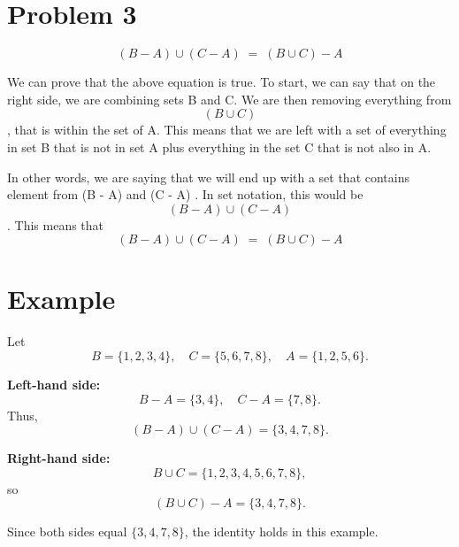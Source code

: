 \documentclass{article}
\begin{document}
\section*{Problem 3}

\[
    (B - A) \cup (C - A) \;=\; (B \cup C) - A
\]

We can prove that the above equation is true. To start, we can say that on the right side, we are combining sets B and C. We are then removing everything from \[(B \cup C)\], that is within the set of A. This means that we are left with a set of everything in set B that is not in set A plus everything in the set C that is not also in A.

In other words, we are saying that we will end up with a set that contains element from
(B - A) and (C - A)
. In set notation, this would be \[
    (B - A) \cup (C - A)
\]. This means that \[
    (B - A) \cup (C - A) \;=\; (B \cup C) - A
\]

\section*{Example}

Let
\[
    B = \{1,2,3,4\}, \quad C = \{5,6,7,8\}, \quad A = \{1,2,5,6\}.
\]

\textbf{Left-hand side:}
\[
    B - A = \{3,4\}, \quad C - A = \{7,8\}.
\]
Thus,
\[
    (B - A) \cup (C - A) = \{3,4,7,8\}.
\]

\textbf{Right-hand side:}
\[
    B \cup C = \{1,2,3,4,5,6,7,8\},
\]
so
\[
    (B \cup C) - A = \{3,4,7,8\}.
\]

Since both sides equal $\{3,4,7,8\}$, the identity holds in this example.
\end{document}
